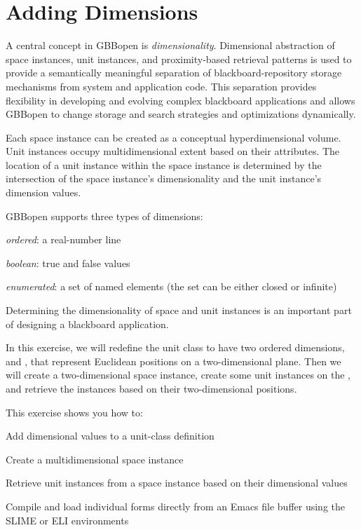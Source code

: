 \documentclass[10pt,twoside,english,pdftex]{article}
\begin{document}
\section{Adding Dimensions}
\label{sec:dimensions}%

A central concept in GBBopen is \textit{dimensionality}.  Dimensional
abstraction of space instances, unit instances, and proximity-based
retrieval patterns is used to provide a semantically meaningful
separation of blackboard-repository storage mechanisms from system and
application code.  This separation provides flexibility in developing
and evolving complex blackboard applications and allows GBBopen to
change storage and search strategies and optimizations dynamically.

Each space instance can be created as a conceptual hyperdimensional
volume.  Unit instances occupy multidimensional extent based on their
attributes.  The location of a unit instance within the space instance
is determined by the intersection of the space instance's
dimensionality and the unit instance's dimension values.

GBBopen supports three types of dimensions:
\begin{tightitemize}
\item \textit{ordered}: a real-number line
\item \textit{boolean}: true and false values
\item \textit{enumerated}: a set of named elements (the set can be
  either closed or infinite)
\end{tightitemize}
Determining the dimensionality of space and unit instances is an
important part of designing a blackboard application.

In this exercise, we will redefine the  unit class to
have two ordered dimensions,  and , that represent
Euclidean positions on a two-dimensional plane.  Then we will create a
two-dimensional  space instance, create some
 unit instances on the , and retrieve
the instances based on their two-dimensional positions.

\fndocrule

This exercise shows you how to:
\begin{tightitemize}
\item Add dimensional values to a unit-class definition
\item Create a multidimensional space instance
\item Retrieve unit instances from a space instance based on their
  dimensional values
\item Compile and load individual forms directly from an Emacs file
  buffer using the SLIME or ELI environments
\end{tightitemize}
\end{document}
